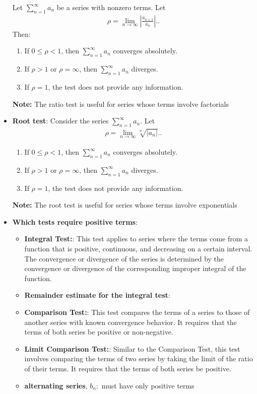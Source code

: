 \documentclass{report}
\begin{document}
\begin{itemize}
    Let \(\sum_{n=1}^{\infty} a_n\) be a series with nonzero terms. Let
    \begin{align*}
        \rho = \lim_{n \to \infty} \left| \frac{a_{n+1}}{a_n} \right|.
    .\end{align*}
    Then:
    \begin{enumerate}[label=\roman*.]
        \item If \(0 \leq \rho < 1\), then \(\sum_{n=1}^{\infty} a_n\) converges absolutely.
        \item If \(\rho > 1\) or \(\rho = \infty\), then \(\sum_{n=1}^{\infty} a_n\) diverges.
        \item If \(\rho = 1\), the test does not provide any information.
    \end{enumerate}
    \bigbreak \noindent 
    \textbf{Note:} The ratio test is useful for series whose terms involve factorials
\item \textbf{Root test}:
    Consider the series \(\sum_{n=1}^{\infty} a_n\). Let
    \begin{align*}
        \rho = \lim_{n \to \infty} \sqrt[n]{|a_n|}.
    .\end{align*}
    \begin{enumerate}[label=\roman*.]
        \item If \(0 \leq \rho < 1\), then \(\sum_{n=1}^{\infty} a_n\) converges absolutely. 
        \item If \(\rho > 1\) or \(\rho = \infty\), then \(\sum_{n=1}^{\infty} a_n\) diverges. 
        \item If \(\rho = 1\), the test does not provide any information.
    \end{enumerate}
    \bigbreak \noindent 
    \textbf{Note:} The root test is useful for series whose terms involve exponentials
\item \textbf{Which tests require positive terms}:
    \begin{itemize}
        \item \textbf{Integral Test:}: This test applies to series where the terms come from a function that is positive, continuous, and decreasing on a certain interval. The convergence or divergence of the series is determined by the convergence or divergence of the corresponding improper integral of the function.
        \item \textbf{Remainder estimate for the integral test}:
        \item \textbf{Comparison Test:}: This test compares the terms of a series to those of another series with known convergence behavior. It requires that the terms of both series be positive or non-negative.
        \item \textbf{Limit Comparison Test:}: Similar to the Comparison Test, this test involves comparing the terms of two series by taking the limit of the ratio of their terms. It requires that the terms of both series be positive.
        \item \textbf{alternating series}, $b_{n}:$ must have only positive terms
    \end{itemize}
\end{itemize}
\end{document}
